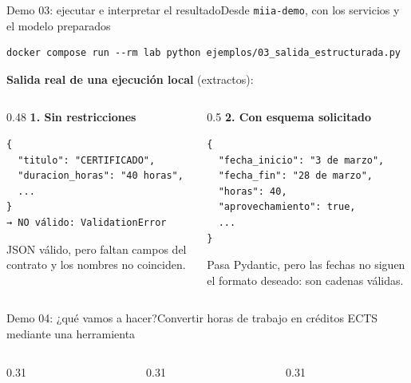 \begin{frame}[fragile]{Demo 03: ejecutar e interpretar el resultado}{Desde \texttt{miia-demo}, con los servicios y el modelo preparados}
	\begin{lstlisting}[language={}]
docker compose run --rm lab python ejemplos/03_salida_estructurada.py
\end{lstlisting}
	\vspace{-3pt}
	{\scriptsize\textbf{Salida real de una ejecución local} (extractos):}
	\begin{columns}[T]
		\begin{column}{0.48\textwidth}
			{\footnotesize\textbf{1. Sin restricciones}}
			\begin{lstlisting}[language={}]
{
  "titulo": "CERTIFICADO",
  "duracion_horas": "40 horas",
  ...
}
→ NO válido: ValidationError
\end{lstlisting}
			{\footnotesize JSON válido, pero faltan campos del contrato y los nombres no coinciden.}
		\end{column}
		\begin{column}{0.5\textwidth}
			{\footnotesize\textbf{2. Con esquema solicitado}}
			\begin{lstlisting}[language={}]
{
  "fecha_inicio": "3 de marzo",
  "fecha_fin": "28 de marzo",
  "horas": 40,
  "aprovechamiento": true,
  ...
}
\end{lstlisting}
			{\footnotesize Pasa Pydantic, pero las fechas no siguen el formato deseado: son cadenas válidas.}
		\end{column}
	\end{columns}
\end{frame}


\begin{frame}{Demo 04: ¿qué vamos a hacer?}{Convertir horas de trabajo en créditos ECTS mediante una herramienta}
	\begin{columns}[T]
		\begin{column}{0.31\textwidth}
		\end{column}
		\begin{column}{0.31\textwidth}
		\end{column}
		\begin{column}{0.31\textwidth}
		\end{column}
	\end{columns}
\end{frame}


